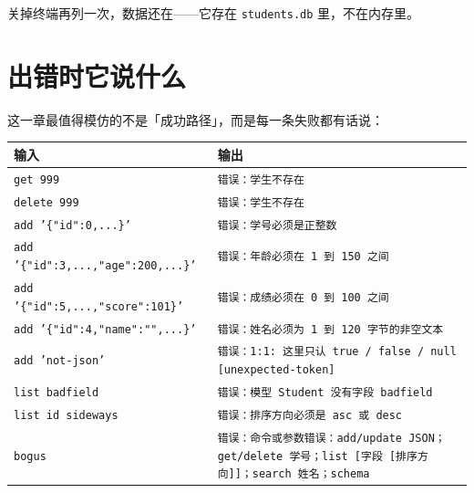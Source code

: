 关掉终端再列一次，数据还在——它存在 \texttt{students.\allowbreak{}db} 里，不在内存里。

\section{出错时它说什么}

这一章最值得模仿的不是「成功路径」，而是每一条失败都有话说：

{\small\setlength{\tabcolsep}{4pt}
\begin{longtable}{>{\raggedright\arraybackslash}p{}>{\raggedright\arraybackslash}p{}}
\toprule
输入 & 输出 \\
\midrule
\endhead
\texttt{get 999} & \texttt{错误：学生不存在} \\
\texttt{delete 999} & \texttt{错误：学生不存在} \\
\texttt{add '\{"id":\allowbreak{}0,\allowbreak{}.\allowbreak{}.\allowbreak{}.\allowbreak{}\}'} & \texttt{错误：学号必须是正整数} \\
\texttt{add '\{"id":\allowbreak{}3,\allowbreak{}.\allowbreak{}.\allowbreak{}.\allowbreak{},\allowbreak{}"age":\allowbreak{}200,\allowbreak{}.\allowbreak{}.\allowbreak{}.\allowbreak{}\}'} & \texttt{错误：年龄必须在 1 到 150 之间} \\
\texttt{add '\{"id":\allowbreak{}5,\allowbreak{}.\allowbreak{}.\allowbreak{}.\allowbreak{},\allowbreak{}"score":\allowbreak{}101\}'} & \texttt{错误：成绩必须在 0 到 100 之间} \\
\texttt{add '\{"id":\allowbreak{}4,\allowbreak{}"name":\allowbreak{}"",\allowbreak{}.\allowbreak{}.\allowbreak{}.\allowbreak{}\}'} & \texttt{错误：姓名必须为 1 到 120 字节的非空文本} \\
\texttt{add 'not-json'} & \texttt{错误：1:\allowbreak{}1:\allowbreak{} 这里只认 true /\allowbreak{} false /\allowbreak{} null [\allowbreak{}unexpected-token]\allowbreak{}} \\
\texttt{list badfield} & \texttt{错误：模型 Student 没有字段 badfield} \\
\texttt{list id sideways} & \texttt{错误：排序方向必须是 asc 或 desc} \\
\texttt{bogus} & \texttt{错误：命令或参数错误：add/\allowbreak{}update JSON；get/\allowbreak{}delete 学号；list [\allowbreak{}字段 [\allowbreak{}排序方向]\allowbreak{}]\allowbreak{}；search 姓名；schema} \\
\bottomrule
\end{longtable}
}

